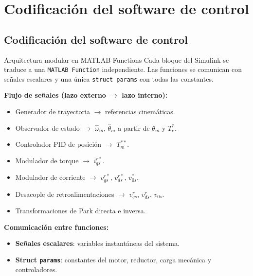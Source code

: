 \documentclass[aspectratio=169,t]{beamer}
\newcommand{\SecPresentacion}{Presentación del problema}
\newcommand{\SecMecanico}{Subsistema mecánico equivalente}
\newcommand{\SecElectromagnetico}{Subsistema electromagnético en coordenadas qd0}
\newcommand{\SecTermico}{Subsistema térmico}
\newcommand{\SecNLGlobal}{Sistema No Lineal Global}
\newcommand{\SecLPV}{Linealización Jacobiana (LPV)}
\newcommand{\SecLTI}{Obtención del modelo LTI equivalente}
\newcommand{\SecAnalisisLTI}{Análisis del modelo LTI aumentado}
\newcommand{\SecDinamica}{Respuesta dinámica en dominio del tiempo}
\newcommand{\SecControlador}{Diseño y análisis del controlador en cascada}
\newcommand{\SecVerifSpecs}{Verificación de desempeño: Especificaciones de operación}
\newcommand{\SecVerifOffset}{Verificación de desempeño: Offset de estado estacionario}
\newcommand{\SecVerifNoIdealidades}{Verificación de desempeño: No idealidades y comportamiento térmico}
\newcommand{\SecDiscretizacion}{Discretización del controlador}
\newcommand{\SecSoftware}{Codificación del software de control}
\newcommand{\AgendaItem}[3]{%
  \ifnum#1=#2
    {\scriptsize\bfseries\color{uncBlue}%
      \hyperlink{sec:#1}{\makebox[2.2em][r]{#1.}\hspace{0.7em}%
      \parbox[t]{0.86\textwidth}{#3}}\par}%
  \else
    {\scriptsize\color{black!26}%
      \hyperlink{sec:#1}{\makebox[2.2em][r]{#1.}\hspace{0.7em}%
      \parbox[t]{0.86\textwidth}{#3}}\par}%
  \fi
  \vspace{0.35mm}%
}
\newcommand{\AgendaBody}[1]{%
    \vspace{3mm}
    {\Large\bfseries\color{uncBlue}Tabla de contenidos\par}
    \vspace{2mm}
    \begin{minipage}{0.94\textwidth}
      \AgendaItem{1}{#1}{\SecPresentacion}
      \AgendaItem{2}{#1}{\SecMecanico}
      \AgendaItem{3}{#1}{\SecElectromagnetico}
      \AgendaItem{4}{#1}{\SecTermico}
      \AgendaItem{5}{#1}\SecNLGlobal
      \AgendaItem{6}{#1}{\SecLPV}
      \AgendaItem{7}{#1}{\SecLTI}
      \AgendaItem{8}{#1}{\SecAnalisisLTI}
      \AgendaItem{9}{#1}{\SecDinamica}
      \AgendaItem{10}{#1}{\SecControlador}
      \AgendaItem{11}{#1}{\SecVerifSpecs}
      \AgendaItem{12}{#1}{\SecVerifOffset}
      \AgendaItem{13}{#1}{\SecVerifNoIdealidades}
      \AgendaItem{14}{#1}{\SecDiscretizacion}
      \AgendaItem{15}{#1}{\SecSoftware}
    \end{minipage}
    \vfill
}
\newcommand{\AgendaSlideTarget}[2]{%
  \begin{frame}[plain]
    \hypertarget{#2}{}%
    \AgendaBody{#1}
  \end{frame}
}
\newcommand{\StartProjectSection}[2]{%
  \section{#2}%
  \subsection{#2}%
  \AgendaSlideTarget{#1}{sec:#1}%
}
\begin{document}

\StartProjectSection{15}{\SecSoftware}

\begin{frame}{Arquitectura modular en MATLAB Functions}
{\small\color{uncGray}Cada bloque del Simulink se traduce a una \texttt{MATLAB Function} independiente. Las funciones se comunican con señales escalares y una única \texttt{struct params} con todas las constantes.}\par
\vspace{3mm}

\textbf{Flujo de señales (lazo externo $\to$ lazo interno):}
\begin{itemize}\small
\item Generador de trayectoria $\to$ referencias cinemáticas.
\item Observador de estado $\to$ $\hat{\omega}_m$, $\hat{\theta}_m$ a partir de $\theta_m$ y $T_e^{*}$.
\item Controlador PID de posición $\to$ $T_m^{**}$.
\item Modulador de torque $\to$ $i_{qs}^{r*}$.
\item Modulador de corriente $\to$ $v_{qs}^{r*}$, $v_{ds}^{r*}$, $v_{0s}^{*}$.
\item Desacople de retroalimentaciones $\to$ $v_{qs}^{r}$, $v_{ds}^{r}$, $v_{0s}$.
\item Transformaciones de Park directa e inversa.
\end{itemize}

\vspace{2mm}
\textbf{Comunicación entre funciones:}
\begin{itemize}\small
\item \textbf{Señales escalares}: variables instantáneas del sistema.
\item \textbf{Struct \texttt{params}}: constantes del motor, reductor, carga mecánica y controladores.
\end{itemize}
\end{frame}
\end{document}
